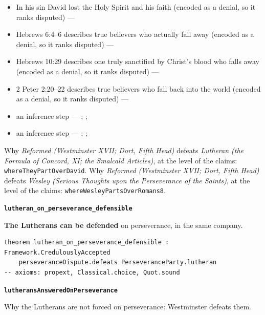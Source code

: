 \documentclass[11pt]{article}
\begin{document}
\begin{itemize}
\begin{itemize}
\item In his sin David lost the Holy Spirit and his faith (encoded as a denial, so it ranks disputed) --- \cite[299--300]{calvin-psalms-2-1846}
\item Hebrews 6:4–6 describes true believers who actually fall away (encoded as a denial, so it ranks disputed) --- \cite[137--138]{calvin-hebrews-1853}
\item Hebrews 10:29 describes one truly sanctified by Christ’s blood who falls away (encoded as a denial, so it ranks disputed) --- \cite[545--546]{owen-works-23-1855}
\item 2 Peter 2:20–22 describes true believers who fall back into the world (encoded as a denial, so it ranks disputed) --- \cite[410--412]{calvin-commentaries-catholic-epistles}
\item an inference step --- \cite[444--445]{wesley-works-9-1827}; \cite[415--416]{calvin-commentary-john-1847}; \cite[Solid Declaration XI.45]{concordia-triglotta-1921}
\item an inference step --- \cite[Trent, Session VI (1547), ch. 13]{tanner-decrees-1990}; \cite[40]{waterworth-trent-1848}; \cite[Solid Declaration XI.42]{concordia-triglotta-1921}
\end{itemize}
\end{itemize}
\noindent Why \emph{Reformed (Westminster XVII; Dort, Fifth Head)} defeats \emph{Lutheran (the Formula of Concord, XI; the Smalcald Articles)}, at the level of the claims: \texttt{where\allowbreak{}They\allowbreak{}Part\allowbreak{}Over\allowbreak{}David}.
\noindent Why \emph{Reformed (Westminster XVII; Dort, Fifth Head)} defeats \emph{Wesley (Serious Thoughts upon the Perseverance of the Saints)}, at the level of the claims: \texttt{where\allowbreak{}Wesley\allowbreak{}Parts\allowbreak{}Over\allowbreak{}Romans8}.
\par\medskip\noindent\textbf{\texttt{lutheran\_\allowbreak{}on\_\allowbreak{}perseverance\_\allowbreak{}defensible}}\par\nobreak\noindent
\textbf{The Lutherans can be defended} on perseverance, in the same company.

{\small\begin{verbatim}
theorem lutheran_on_perseverance_defensible : Framework.CredulouslyAccepted
    perseveranceDispute.defeats PerseveranceParty.lutheran
-- axioms: propext, Classical.choice, Quot.sound
\end{verbatim}}
\par\medskip\noindent\textbf{\texttt{lutherans\allowbreak{}Answered\allowbreak{}On\allowbreak{}Perseverance}}\par\nobreak\noindent
Why the Lutherans are not forced on perseverance: Westminster defeats them.
\end{document}
